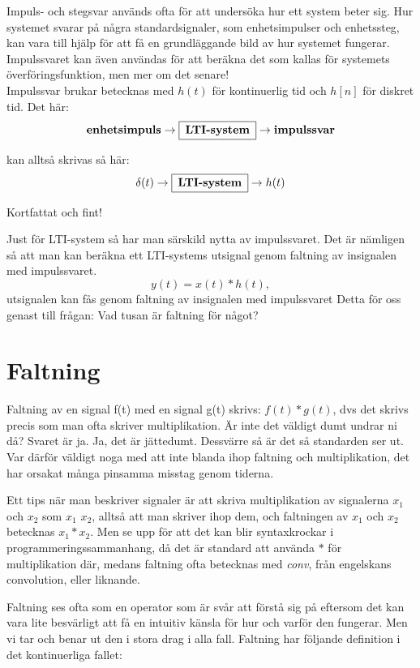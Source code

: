 \documentclass{article}
\begin{document}
Impuls- och stegsvar används ofta för att undersöka hur ett system beter sig.
Hur systemet svarar på några standardsignaler, som enhetsimpulser och
enhetssteg, kan vara till hjälp för att få en grundläggande bild av hur
systemet fungerar. Impulssvaret kan även användas för att beräkna det som
kallas för systemets överföringsfunktion, men mer om det senare! \\
\newline
Impulssvar brukar betecknas med $h(t)$ för kontinuerlig tid och $h[n]$ för diskret tid.
Det här:
$$\textbf{enhetsimpuls} \rightarrow \framebox[1.2\width]{\textbf{LTI-system}} \rightarrow \textbf{impulssvar} $$

kan alltså skrivas så här:
$$\delta (t) \rightarrow \framebox[1.2\width]{\textbf{LTI-system}} \rightarrow h(t) $$

Kortfattat och fint!
\newline

Just för LTI-system så har man särskild nytta av impulssvaret. Det är
nämligen så att man kan beräkna ett LTI-systems utsignal genom faltning av insignalen med impulssvaret.
$$ y(t)=x(t)*h(t),$$ 
utsignalen kan fås genom faltning av insignalen med impulssvaret
Detta för oss genast till frågan: Vad tusan är faltning för något?

\section{Faltning}

Faltning av en signal f(t) med en signal g(t) skrivs: $f(t)*g(t)$, dvs det 
skrivs precis som man ofta skriver multiplikation. Är inte det väldigt dumt
undrar ni då? Svaret är ja. Ja, det är jättedumt. Dessvärre så är det så
standarden ser ut. Var därför väldigt noga med att inte blanda ihop faltning
och multiplikation, det har orsakat många pinsamma misstag genom tiderna.
\newline

Ett tips när man beskriver signaler är att skriva multiplikation
av signalerna $x_1$ och $x_2$ som \emph{$x_1$ $x_2$}, alltså att man skriver ihop dem,
och faltningen av $x_1$ och $x_2$ betecknas $x_1 * x_2$. Men se upp för att det
kan blir syntaxkrockar i programmeringssammanhang, då det är standard att
använda $*$ för multiplikation där, medans faltning ofta betecknas med \emph{conv}, från engelskans convolution, eller liknande.


Faltning ses ofta som en operator som är svår att förstå sig på eftersom
det kan vara lite besvärligt att få en intuitiv känsla för hur och varför
den fungerar. Men vi tar och benar ut den i stora drag i alla fall.
Faltning har följande definition i det kontinuerliga fallet:
\end{document}
